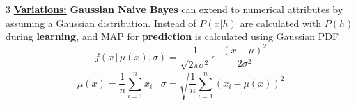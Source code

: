 \documentclass[letterpaper, 10.5pt,landscape]{article}
\makeatletter
\def\mathcolor#1#{\@mathcolor{#1}}
\def\@mathcolor#1#2#3{%
  \protect\leavevmode
  \begingroup
    \color#1{#2}#3%
  \endgroup
}
\renewcommand{\subsubsection}{\@startsection{subsubsection}{3}{0mm}%
                                {-1ex plus -.5ex minus -.2ex}%
                                {1ex plus .2ex}%
                                {\normalfont\small\bfseries}}
\makeatother
\begin{document}
\begin{multicols*}{3}
\vspace{3pt} 
\textbf{\underline{Variations:}} \textbf{Gaussian Naive Bayes} can extend to numerical attributes by assuming a Gaussian distribution. Instead of $P(x|h)$ are calculated with $P(h)$ during \textbf{learning}, and MAP for \textbf{prediction} is calculated using Gaussian PDF
\vspace{-3pt}
\[\boxed{f(x \, | \,  \mu(x), \sigma) = \frac{1}{\sqrt{2 \pi \sigma^{2}}} e^-{\frac{(x-\mu)^{2}}{2\sigma^{2}}} }\]
\vspace{-3pt}
\[\mu(x) = \frac{1}{n} \sum^{n}_{i=1} x_{i} \hspace{10pt}  \sigma = \sqrt{\frac{1}{n} \sum^{n}_{i=1} \left( x_{i} - \mu(x) \right)^{2}} \]


















\end{multicols*}
\end{document}
